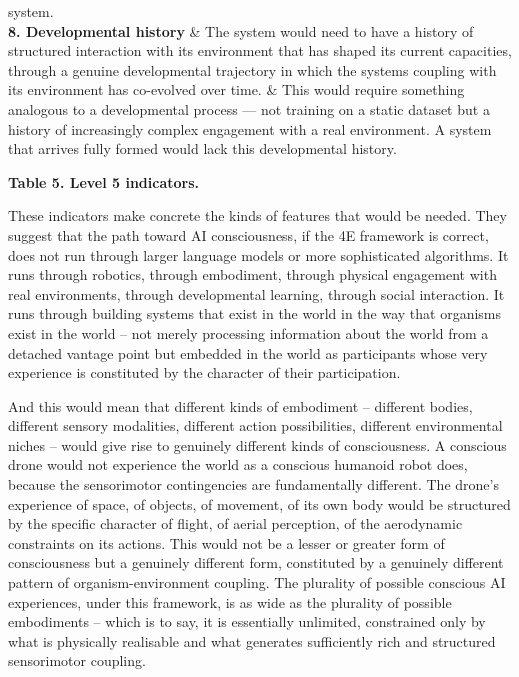 \documentclass[11pt, a4paper, onecolumn, gdm]{google}
\begin{document}
{\begin{longtable}[]
system. \\
\textbf{8. Developmental history} & The system would need to have a
history of structured interaction with its environment that has shaped
its current capacities, through a genuine developmental trajectory in
which the system\textquotesingle s coupling with its environment has
co-evolved over time. & This would require something analogous to a
developmental process --- not training on a static dataset but a history
of increasingly complex engagement with a real environment. A system
that arrives fully formed would lack this developmental history. \\
\end{longtable}
}

\textbf{Table 5. Level 5 indicators.}

These indicators make concrete the kinds of features that would be needed.
They suggest that the path toward AI consciousness, if the 4E framework is correct, does not run through larger language models or more sophisticated algorithms.
It runs through robotics, through embodiment, through physical engagement with real environments, through developmental learning, through social interaction.
It runs through building systems that exist in the world in the way that organisms exist in the world -- not merely processing information about the world from a detached vantage point but embedded in the world as participants whose very experience is constituted by the character of their participation.

And this would mean that different kinds of embodiment -- different bodies, different sensory modalities, different action possibilities, different environmental niches -- would give rise to genuinely different kinds of consciousness.
A conscious drone would not experience the world as a conscious humanoid robot does, because the sensorimotor contingencies are fundamentally different.
The drone's experience of space, of objects, of movement, of its own body would be structured by the specific character of flight, of aerial perception, of the aerodynamic constraints on its actions.
This would not be a lesser or greater form of consciousness but a genuinely different form, constituted by a genuinely different pattern of organism-environment coupling.
The plurality of possible conscious AI experiences, under this framework, is as wide as the plurality of possible embodiments -- which is to say, it is essentially unlimited, constrained only by what is physically realisable and what generates sufficiently rich and structured sensorimotor coupling.
\end{document}

